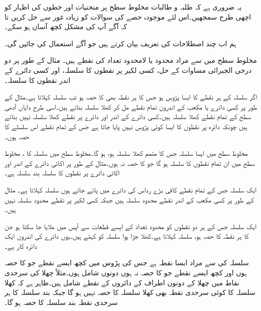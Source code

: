 یہ ضروری ہے کہ طلبہ و طالبات مخلوط سطح پر منحنیات اور خطوں کی اظہار کو اچھی طرح سمجھیں۔اس لئے موجودہ حصے کی سوالات کو زیادہ غور سے حل کریں تا کہ آگے آپ کی مشکل کچھ آسان ہو سکے۔

ہم اب چند اصطلاحات کی تعریف  بیان کرتے ہیں جو آگے استعمال کی جائیں گی۔

مخلوط سطح میں  سے مراد محدود یا لامحدود تعداد کی نقطے ہیں۔  مثال کے طور پر دو درجی الجبرائی مساوات کے حل، کسی لکیر پر نقطوں کا سلسلہ، اور کسی دائرے کے اندر نقطوں کا سلسلہ۔

اگر سلسلہ  کے ہر نقطے کا ایسا پڑوس ہو جس کا ہر نقطہ بھی  کا حصہ ہو تب   سلسلہ  کہلاتا ہے۔مثال کے طور پر کسی دائرے یا مکعب کے اندرون تمام نقطے  مل کر کھلا سلسلہ بناتے ہیں۔اسی طرح دایاں آدھی سطح  کے تمام نقطے کھلا سلسلہ ہیں۔کسی دائرے کے اندر اور دائرے پر نقطے  کھلا سلسلہ نہیں بناتے ہیں چونکہ دائرہ پر نقطوں کا ایسا کوئی پڑوس نہیں پایا جاتا ہے جس کے تمام نقطے اس سلسلے کا حصہ ہوں۔

 مخلوط سطح میں ایسا سلسلہ جس کا متمم کھلا سلسلہ ہو،  ہو گا۔مخلوط سطح میں سلسلہ  کا ، مخلوط سطح میں ان تمام نقطوں کا سلسلہ ہو گا جو  کا حصہ نہ ہوں۔مثال کے طور پر اکائی دائرے کے اندر اور اکائی دائرے پر نقطوں کا سلسلہ بند سلسلہ ہے۔

ایک سلسلہ جس کے تمام نقطے کافی بڑے رداس کی دائرے میں پائے جاتے ہوں  سلسلہ کہلاتا ہے۔ مثال کے طور پر کسی مکعب کے اندر نقطے محدود سلسلہ ہیں جبکہ کسی لکیر پر نقطے محدود سلسلہ نہیں ہیں۔

ایک سلسلہ  جس کے ہر دو نقطوں کو محدود تعداد کے ایسے قطعات سے آپس میں ملایا جا سکتا ہو جن کا ہر نقطہ  کا حصہ ہو،  سلسلہ کہلاتا ہے۔کھلا جڑا ہوا سلسلہ کو  کہتے ہیں۔یوں دائرے کی اندرون ایک دائرہ کار ہے۔

سلسلہ  کی  سے مراد  ایسا نقطہ ہے جس کی پڑوس میں کچھ ایسے  نقطے جو  کا حصہ ہوں اور کچھ ایسے  نقطے جو  کا حصہ نہ ہوں دونوں شامل ہوں۔مثلاً چھلا کی سرحدی نقاط میں چھلا کے دونوں اطراف کے دائروں کے نقطے  شامل ہیں۔ظاہر ہے کہ کھلا سلسلہ  کا کوئی سرحدی نقطہ  بھی کھلا سلسلہ کا حصہ نہیں ہو گا جبکہ بند سلسلہ کا ہر سرحدی نقطہ بند سلسلہ کا حصہ ہو گا۔

